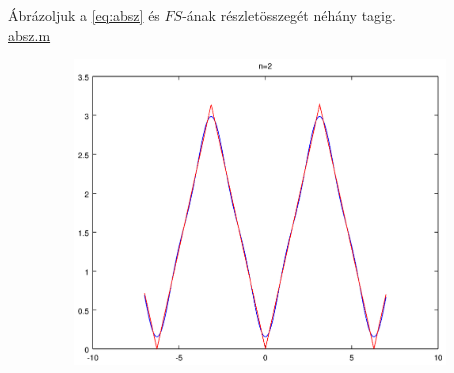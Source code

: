 \begin{spacing}{1.3}
 Ábrázoljuk a \eqref{eq:absz}  és $FS$-ának részletösszegét néhány tagig.\\
\href{M/absz.m}{absz.m}
\begin{center}
\includegraphics[width=40cm,height=8.1cm]{M/absz.eps}
\end{center}



\end{spacing}

